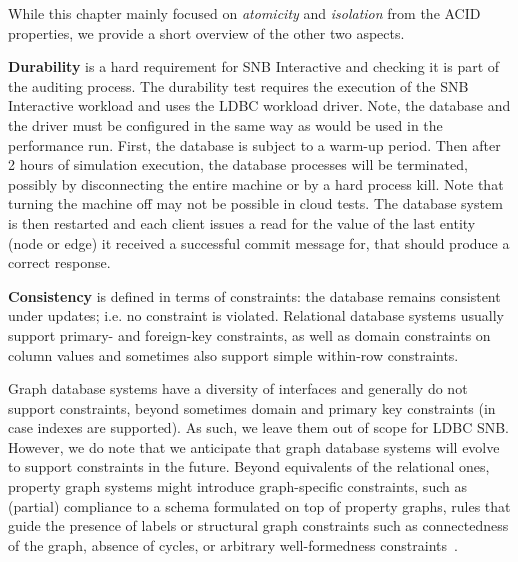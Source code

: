 While this chapter mainly focused on \emph{atomicity} and \emph{isolation} from the ACID properties, we provide a short overview of the other two aspects.

{\bf Durability} is a hard requirement for SNB Interactive and checking it is part of the 
auditing process. 
The durability test requires the execution of the SNB Interactive workload and uses the LDBC workload driver.
Note, the database and the driver must be configured in the same way as would be used in the performance run.
First, the database is subject to a warm-up period.
Then after 2 hours of simulation execution, the database processes will be terminated, possibly by disconnecting the entire machine or by a hard process kill.
Note that turning the machine off may not be possible in cloud tests.
The database system is then restarted and each client issues a read for the value of the last entity (node or edge) it received a successful commit message for, that should produce a correct response.


{\bf Consistency} is defined in terms of constraints: the database remains 
consistent under updates; i.e. no constraint is violated.
Relational database systems usually support primary- and foreign-key 
constraints, as well as domain constraints on column values and 
sometimes also support simple within-row constraints.

Graph database systems have a diversity of interfaces and generally do not
support constraints, beyond sometimes domain and primary key constraints 
(in case indexes are supported).
As such, we leave them out of scope for LDBC SNB. 
However, we do note that we anticipate that graph database 
systems will evolve to support constraints in the future. 
Beyond equivalents of the relational ones, property graph systems 
might introduce graph-specific constraints, such as (partial) compliance to
a schema formulated on top of property graphs, rules that guide the 
presence of labels or structural graph constraints such as
connectedness of the graph, absence of cycles, %
or arbitrary well-formedness constraints~\cite{DBLP:journals/sosym/SemerathBHSV17}.
